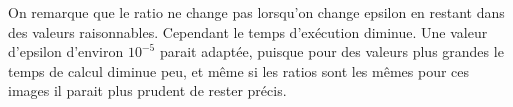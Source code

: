 		On remarque que le ratio ne change pas lorsqu'on change epsilon en restant dans des valeurs raisonnables. Cependant le temps d'exécution diminue. Une valeur d'epsilon d'environ $10^{-5}$ parait adaptée, puisque pour des valeurs plus grandes le temps de calcul diminue peu, et même si les ratios sont les mêmes pour ces images il parait plus prudent de rester précis.
	
